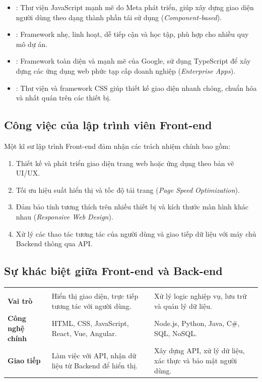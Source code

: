\begin{itemize}[leftmargin=1.8em, itemsep=3pt, parsep=0pt]
    \item {}: Thư viện JavaScript mạnh mẽ do Meta phát triển, giúp xây dựng giao diện người dùng theo dạng thành phần tái sử dụng (\textit{Component-based}).
    \item {}: Framework nhẹ, linh hoạt, dễ tiếp cận và học tập, phù hợp cho nhiều quy mô dự án.
    \item {}: Framework toàn diện và mạnh mẽ của Google, sử dụng TypeScript để xây dựng các ứng dụng web phức tạp cấp doanh nghiệp (\textit{Enterprise Apps}).
    \item {}: Thư viện và framework CSS giúp thiết kế giao diện nhanh chóng, chuẩn hóa và nhất quán trên các thiết bị.
\end{itemize}

\subsection{Công việc của lập trình viên Front-end}

Một kĩ sư lập trình Front-end đảm nhận các trách nhiệm chính bao gồm:
\begin{enumerate}[label=\textbf{\color{primaryBlue}\arabic*.}, leftmargin=2em, itemsep=3pt, parsep=0pt, topsep=2pt]
    \item Thiết kế và phát triển giao diện trang web hoặc ứng dụng theo bản vẽ UI/UX.
    \item Tối ưu hiệu suất hiển thị và tốc độ tải trang (\textit{Page Speed Optimization}).
    \item Đảm bảo tính tương thích trên nhiều thiết bị và kích thước màn hình khác nhau (\textit{Responsive Web Design}).
    \item Xử lý các thao tác tương tác của người dùng và giao tiếp dữ liệu với máy chủ Backend thông qua API.
\end{enumerate}

\subsection{Sự khác biệt giữa Front-end và Back-end}

\begin{prettyTableBox}
\begin{tabularx}{\linewidth}{>{\bfseries\color{primaryBlue}}C{2.6cm} Z Z}
 &  &  \\
Vai trò & Hiển thị giao diện, trực tiếp tương tác với người dùng. & Xử lý logic nghiệp vụ, lưu trữ và quản lý dữ liệu. \\
Công nghệ chính & HTML, CSS, JavaScript, React, Vue, Angular. & Node.js, Python, Java, C\#, SQL, NoSQL. \\
Giao tiếp & Làm việc với API, nhận dữ liệu từ Backend để hiển thị. & Xây dựng API, xử lý dữ liệu, xác thực và bảo mật người dùng. \\
\end{tabularx}
\end{prettyTableBox}


